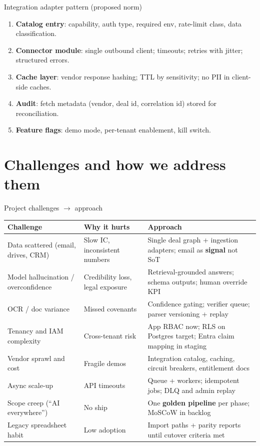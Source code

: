 \documentclass[aspectratio=169,11pt]{beamer}
\begin{document}
\begin{frame}{Integration adapter pattern (proposed norm)}
  \small
  \begin{enumerate}
    \item \textbf{Catalog entry}: capability, auth type, required env, rate-limit class, data classification.
    \item \textbf{Connector module}: single outbound client; timeouts; retries with jitter; structured errors.
    \item \textbf{Cache layer}: vendor response hashing; TTL by sensitivity; no PII in client-side caches.
    \item \textbf{Audit}: fetch metadata (vendor, deal id, correlation id) stored for reconciliation.
    \item \textbf{Feature flags}: demo mode, per-tenant enablement, kill switch.
  \end{enumerate}
\end{frame}

\section{Challenges and how we address them}

\begin{frame}{Project challenges $\rightarrow$ approach}
  \tiny
  \begin{tabular}{p{3.35cm}p{4.15cm}p{5.5cm}}
    \textbf{Challenge} & \textbf{Why it hurts} & \textbf{Approach} \\
    \hline
    Data scattered (email, drives, CRM) & Slow IC, inconsistent numbers & Single deal graph + ingestion adapters; email as \textbf{signal} not SoT \\
    Model hallucination / overconfidence & Credibility loss, legal exposure & Retrieval-grounded answers; schema outputs; human override KPI \\
    OCR / doc variance & Missed covenants & Confidence gating; verifier queue; parser versioning + replay \\
    Tenancy and IAM complexity & Cross-tenant risk & App RBAC now; RLS on Postgres target; Entra claim mapping in staging \\
    Vendor sprawl and cost & Fragile demos & Integration catalog, caching, circuit breakers, entitlement docs \\
    Async scale-up & API timeouts & Queue + workers; idempotent jobs; DLQ and admin replay \\
    Scope creep (``AI everywhere'') & No ship & One \textbf{golden pipeline} per phase; MoSCoW in backlog \\
    Legacy spreadsheet habit & Low adoption & Import paths + parity reports until cutover criteria met \\
  \end{tabular}
\end{frame}
\end{document}
